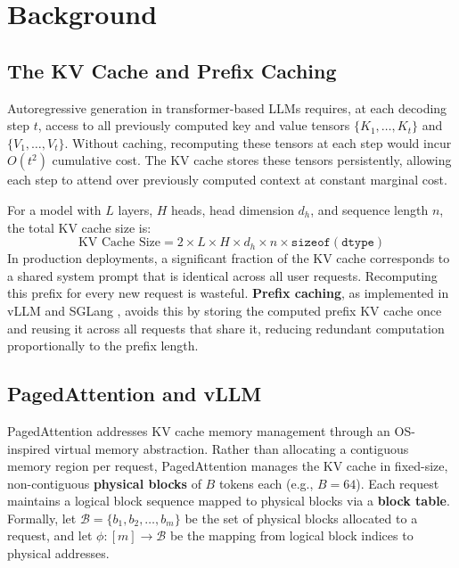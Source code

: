 \documentclass{article}
\begin{document}
\section{Background}
\label{sec:background}

\subsection{The KV Cache and Prefix Caching}

Autoregressive generation in transformer-based LLMs requires, at each
decoding step $t$, access to all previously computed key and value tensors
$\{K_1, \ldots, K_t\}$ and $\{V_1, \ldots, V_t\}$. Without caching,
recomputing these tensors at each step would incur $O(t^2)$ cumulative
cost. The KV cache stores these tensors persistently, allowing each step
to attend over previously computed context at constant marginal cost.

For a model with $L$ layers, $H$ heads, head dimension $d_h$, and sequence
length $n$, the total KV cache size is:
%
\begin{equation}
  \text{KV Cache Size} = 2 \times L \times H \times d_h \times n
    \times \texttt{sizeof}(\texttt{dtype})
  \label{eq:kvcache-size}
\end{equation}
%
In production deployments, a significant fraction of the KV cache
corresponds to a shared system prompt that is identical across all user
requests. Recomputing this prefix for every new request is wasteful.
\textbf{Prefix caching}, as implemented in vLLM \cite{pagedattention} and
SGLang \cite{zheng2024sglang}, avoids this by storing the computed prefix
KV cache once and reusing it across all requests that share it, reducing
redundant computation proportionally to the prefix length.

\subsection{PagedAttention and vLLM}

PagedAttention \cite{pagedattention} addresses KV cache memory management
through an OS-inspired virtual memory abstraction. Rather than allocating
a contiguous memory region per request, PagedAttention manages the KV cache
in fixed-size, non-contiguous \textbf{physical blocks} of $B$ tokens each
(e.g., $B = 64$). Each request maintains a logical block sequence mapped to
physical blocks via a \textbf{block table}. Formally, let
$\mathcal{B} = \{b_1, b_2, \ldots, b_m\}$ be the set of physical blocks
allocated to a request, and let $\phi: [m] \rightarrow \mathcal{B}$ be the
mapping from logical block indices to physical addresses.
\end{document}
